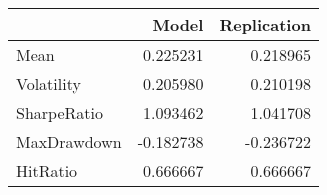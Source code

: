 \begin{tabular}{lrr}
\toprule
{} &     Model &  Replication \\
\midrule
Mean        &  0.225231 &     0.218965 \\
Volatility  &  0.205980 &     0.210198 \\
SharpeRatio &  1.093462 &     1.041708 \\
MaxDrawdown & -0.182738 &    -0.236722 \\
HitRatio    &  0.666667 &     0.666667 \\
\bottomrule
\end{tabular}
